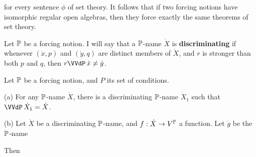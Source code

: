 
\noindent for every sentence $\phi$ of
set theory.   It follows that if two forcing notions
have isomorphic regular open algebras, then they force exactly the same
theorems of set theory.

 Let $\Bbb P$ be a forcing notion.
I will say that a
$\Bbb P$-name $\dot X$ is {\bf discriminating} if whenever $(\dot x,p)$ and
$(\dot y,q)$ are distinct members of $\dot X$, and $r$ is stronger than
both $p$ and $q$, then $r\VVdP\,\dot x\ne\dot y$.

 Let $\Bbb P$ be a forcing notion, and $P$ its
set of conditions.

(a) For any $\Bbb P$-name $\dot X$,
there is a discriminating $\Bbb P$-name $\dot X_1$
such that $\VVdP\,\dot X_1=\dot X$.

(b) Let $\dot X$ be a
discriminating $\Bbb P$-name, and $f:\dot X\to V^{\Bbb P}$ a function.
Let $\dot g$ be the $\Bbb P$-name


\noindent Then


